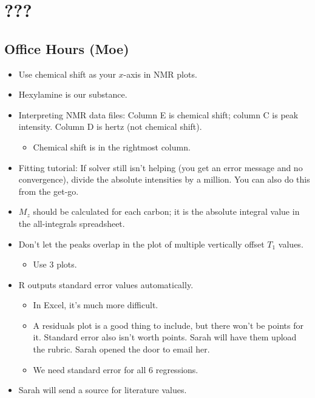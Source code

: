 \documentclass[../notes.tex]{subfiles}
\begin{document}
\chapter{???}
\section{Office Hours (Moe)}
\begin{itemize}
    \item {}Use chemical shift as your $x$-axis in NMR plots.
    \item Hexylamine is our substance.
    \item Interpreting NMR data files: Column E is chemical shift; column C is peak intensity. Column D is hertz (not chemical shift).
    \begin{itemize}
        \item Chemical shift is in the rightmost column.
    \end{itemize}
    \item Fitting tutorial: If solver still isn't helping (you get an error message and no convergence), divide the absolute intensities by a million. You can also do this from the get-go.
    \item $M_z$ should be calculated for each carbon; it is the absolute integral value in the all-integrals spreadsheet.
    \item Don't let the peaks overlap in the plot of multiple vertically offset $T_1$ values.
    \begin{itemize}
        \item Use 3 plots.
    \end{itemize}
    \item R outputs standard error values automatically.
    \begin{itemize}
        \item In Excel, it's much more difficult.
        \item A residuals plot is a good thing to include, but there won't be points for it. Standard error also isn't worth points. Sarah will have them upload the rubric. Sarah opened the door to email her.
        \item We need standard error for all 6 regressions.
    \end{itemize}
    \item Sarah will send a source for literature values.
\end{itemize}
\end{document}
